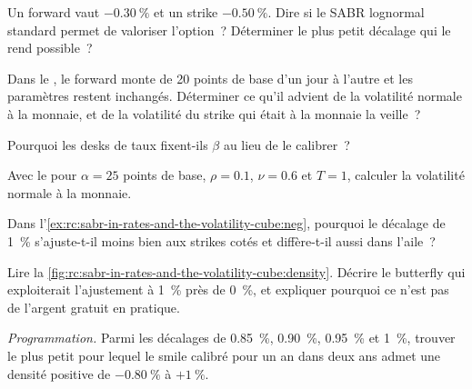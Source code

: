 \begin{exercise}[$\star$]\label{exo:rc:sabr-in-rates-and-the-volatility-cube:1}
Un forward vaut $-0.30~\%$ et un strike $-0.50~\%$. Dire si le SABR lognormal standard permet de valoriser
l'option~? Déterminer le plus petit décalage qui le rend possible~?
\end{exercise}

\begin{exercise}[$\star$]\label{exo:rc:sabr-in-rates-and-the-volatility-cube:2}
Dans le , le forward monte de 20 points de base d'un jour à l'autre et les
paramètres restent inchangés. Déterminer ce qu'il advient de la volatilité normale à la monnaie,
et de la volatilité du strike qui était à la monnaie la veille~?
\end{exercise}

\begin{exercise}[$\star$]\label{exo:rc:sabr-in-rates-and-the-volatility-cube:3}
Pourquoi les desks de taux fixent-ils $\beta$ au lieu de le calibrer~?
\end{exercise}

\begin{exercise}[$\star\star$]\label{exo:rc:sabr-in-rates-and-the-volatility-cube:4}
Avec le  pour $\alpha=25$ points de base, $\rho=0.1$, $\nu=0.6$ et $T=1$,
calculer la volatilité normale à la monnaie.
\end{exercise}

\begin{exercise}[$\star\star$]\label{exo:rc:sabr-in-rates-and-the-volatility-cube:5}
Dans l'\cref{ex:rc:sabr-in-rates-and-the-volatility-cube:neg}, pourquoi le décalage de 1~\%
s'ajuste-t-il moins bien aux strikes cotés et diffère-t-il aussi dans l'aile~?
\end{exercise}

\begin{exercise}[$\star\star$]\label{exo:rc:sabr-in-rates-and-the-volatility-cube:6}
Lire la \cref{fig:rc:sabr-in-rates-and-the-volatility-cube:density}. Décrire le
butterfly qui exploiterait l'ajustement à 1~\% près de 0~\%, et expliquer pourquoi ce n'est pas
de l'argent gratuit en pratique.
\end{exercise}

\begin{exercise}[$\star\star\star$]\label{exo:rc:sabr-in-rates-and-the-volatility-cube:7}
\emph{Programmation.} Parmi les décalages de 0.85~\%, 0.90~\%, 0.95~\% et 1~\%, trouver le plus petit
pour lequel le smile calibré pour un an dans deux ans admet une densité positive
de $-0.80~\%$ à $+1~\%$.
\end{exercise}

